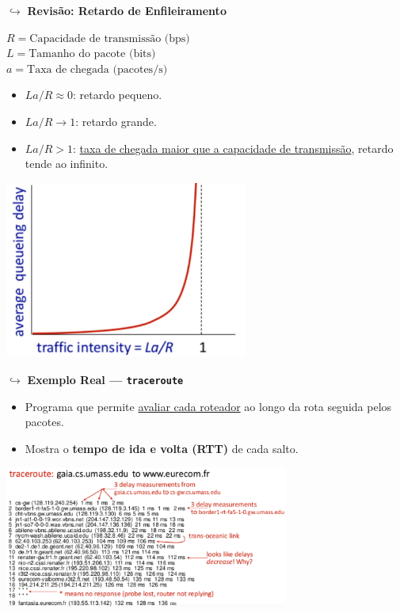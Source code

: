         $\hookrightarrow$ \textbf{Revisão: Retardo de Enfileiramento}
        
        $R = \text{Capacidade de transmissão (bps)}$ \\ 
        $L = \text{Tamanho do pacote (bits)}$ \\
        $a = \text{Taxa de chegada (pacotes/s)}$
        
        \begin{itemize}
            \item $La/R \approx 0$: retardo pequeno.
            \item $La/R \rightarrow 1$: retardo grande.
            \item $La/R > 1$: \underline{taxa de chegada maior que a capacidade de transmissão}, retardo tende ao infinito.
        \end{itemize}

        \begin{center}
            \includegraphics[width=0.6\textwidth]{img/cap-01/retardo-de-enfileiramento.png}
        \end{center}

        $\hookrightarrow$ \textbf{Exemplo Real — \texttt{traceroute}}
        \begin{itemize}
            \item Programa que permite \underline{avaliar cada roteador} ao longo da rota seguida pelos pacotes.
            \item Mostra o \textbf{tempo de ida e volta (RTT)} de cada salto.
        \end{itemize}

        \begin{center}
            \includegraphics[width=0.7\textwidth]{img/cap-01/traceroute-exemplo.png}
        \end{center}

